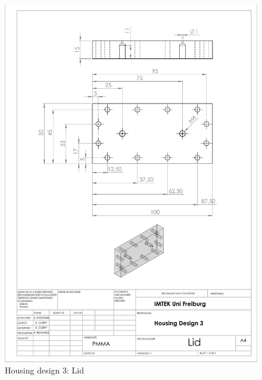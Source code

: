 \begin{figure}[h]%
\centering
\includegraphics[width=1\textwidth]{figures/appendix/housingdesign3lid}%
\caption{Housing design 3: Lid}%
\label{housingdesign3lid}%
\end{figure}

\clearpage

